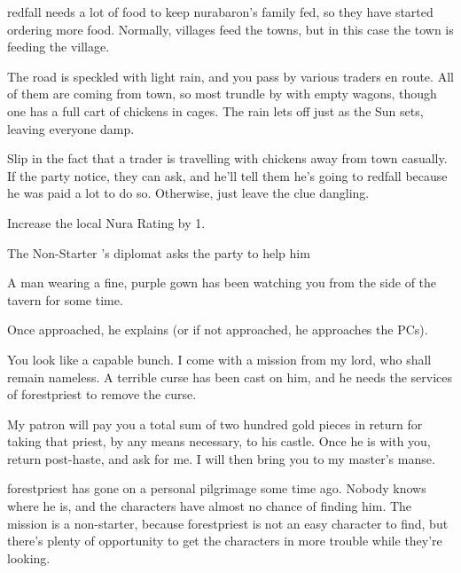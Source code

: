 \begin{multicols}{2}
\Gls{redfall} needs a lot of food to keep \gls{nurabaron}'s family fed, so they have started ordering more food.
Normally, villages feed the towns, but in this case the town is feeding the village.

\begin{boxtext}

	The road is speckled with light rain, and you pass by various traders en route.
	All of them are coming from town, so most trundle by with empty wagons, though one has a full cart of chickens in cages.
	The rain lets off just as the Sun sets, leaving everyone damp.

\end{boxtext}

Slip in the fact that a trader is travelling with chickens away from \gls{town} casually.
If the party notice, they can ask, and he'll tell them he's going to \gls{redfall} because he was paid a lot to do so.
Otherwise, just leave the clue dangling.

Increase the local Nura Rating by 1.

\resumecontents[Town]

{The Non-Starter}%
{'s diplomat asks the party to help him}%
\label{nonstarter}

\stopcontents[Town]

\begin{boxtext}

	A man wearing a fine, purple gown has been watching you from the side of the tavern for some time.

\end{boxtext}

Once approached, he explains (or if not approached, he approaches the PCs).

\begin{speechtext}

	You look like a capable bunch.
	I come with a mission from my lord, who shall remain nameless.
	A terrible curse has been cast on him, and he needs the services of \gls{forestpriest} to remove the curse.

	My patron will pay you a total sum of two hundred gold pieces in return for taking that priest, by any means necessary, to his castle.
	Once he is with you, return post-haste, and ask for me.
	I will then bring you to my master's manse.

\end{speechtext}

\Gls{forestpriest} has gone on a personal pilgrimage some time ago.
Nobody knows where he is, and the characters have almost no chance of finding him.
The mission is a non-starter, because \gls{forestpriest} is not an easy character to find, but there's plenty of opportunity to get the characters in more trouble while they're looking.


\end{multicols}
